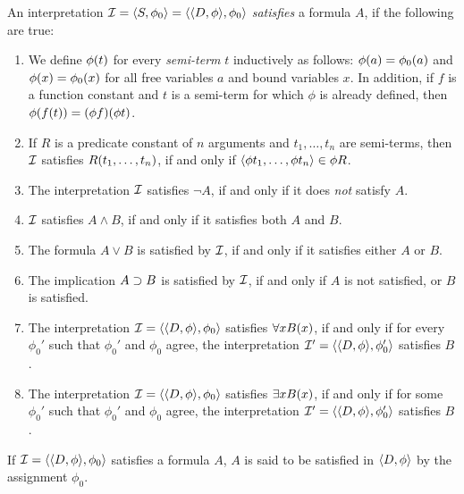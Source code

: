 \documentclass[11pt,a4paper]{article}
\begin{document}
\begin{definition}\label{def:formula satisfying interpretation}
    An interpretation \(\mathcal{I} = \langle S,\phi_0\rangle = \langle\langle D,\phi\rangle,\phi_0\rangle\)
    \emph{satisfies} a formula \(A\), if the following are true:
    \begin{enumerate}
        \item
            We define \(\phi(t)\) for every \emph{semi-term} \(t\) inductively
            as follows: \(\phi(a) = \phi_0(a)\) and \(\phi(x) = \phi_0(x)\)
            for all free variables \(a\) and bound variables \(x\). In addition,
            if \(f\) is a function constant and \(t\) is a semi-term for which \(\phi\)
            is already defined, then \(\phi(f(t)) = (\phi f)(\phi t)\).
        \item
            If \(R\) is a predicate constant of \(n\) arguments
            and \(t_1,\ldots,t_n\) are semi-terms, then \(\mathcal{I}\)
            satisfies \(R(t_1,\ldots,t_n)\), if and only if
            \(\langle\phi t_1,\ldots,\phi t_n\rangle\in\phi R\).
        \item
            The interpretation \(\mathcal{I}\) satisfies \(\lnot A\),
            if and only if it does \emph{not} satisfy \(A\).
        \item
            \(\mathcal{I}\) satisfies \(A\land B\), if and only if it satisfies
            both \(A\) and \(B\).
        \item
            The formula \(A\lor B\)
            is satisfied by \(\mathcal{I}\), if and only if it
            satisfies either \(A\) or \(B\).
        \item
            The implication \(A\supset B\) is satisfied by \(\mathcal{I}\),
            if and only if \(A\) is not satisfied,
            or \(B\) is satisfied.
        \item
            The interpretation \(\mathcal{I} = \langle\langle D,\phi\rangle,\phi_0\rangle\)
            satisfies \(\forall xB(x)\), if and only if for every \(\phi_0'\)
            such that \(\phi_0'\) and \(\phi_0\) agree,
            the interpretation \(\mathcal{I}' = \langle\langle D,\phi\rangle,\phi_0'\rangle\)
            satisfies \(B\).
        \item
            The interpretation \(\mathcal{I} = \langle\langle D,\phi\rangle,\phi_0\rangle\)
            satisfies \(\exists xB(x)\), if and only if for some \(\phi_0'\)
            such that \(\phi_0'\) and \(\phi_0\) agree,
            the interpretation \(\mathcal{I}' = \langle\langle D,\phi\rangle,\phi_0'\rangle\)
            satisfies \(B\).
    \end{enumerate}
    If \(\mathcal{I} = \langle\langle D,\phi\rangle,\phi_0\rangle\) satisfies a formula \(A\),
    \(A\) is said to be satisfied in \(\langle D,\phi\rangle\) by the assignment \(\phi_0\).
\end{definition}
\end{document}
